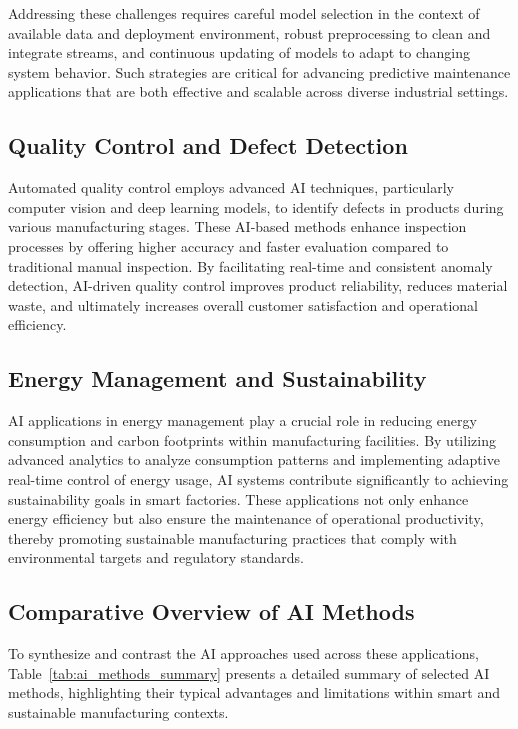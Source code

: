 \documentclass[sigconf]{acmart}
\begin{document}
Addressing these challenges requires careful model selection in the context of available data and deployment environment, robust preprocessing to clean and integrate streams, and continuous updating of models to adapt to changing system behavior. Such strategies are critical for advancing predictive maintenance applications that are both effective and scalable across diverse industrial settings.

\subsection{Quality Control and Defect Detection}
Automated quality control employs advanced AI techniques, particularly computer vision and deep learning models, to identify defects in products during various manufacturing stages. These AI-based methods enhance inspection processes by offering higher accuracy and faster evaluation compared to traditional manual inspection. By facilitating real-time and consistent anomaly detection, AI-driven quality control improves product reliability, reduces material waste, and ultimately increases overall customer satisfaction and operational efficiency.

\subsection{Energy Management and Sustainability}
AI applications in energy management play a crucial role in reducing energy consumption and carbon footprints within manufacturing facilities. By utilizing advanced analytics to analyze consumption patterns and implementing adaptive real-time control of energy usage, AI systems contribute significantly to achieving sustainability goals in smart factories. These applications not only enhance energy efficiency but also ensure the maintenance of operational productivity, thereby promoting sustainable manufacturing practices that comply with environmental targets and regulatory standards.

\subsection{Comparative Overview of AI Methods}
To synthesize and contrast the AI approaches used across these applications, Table~\ref{tab:ai_methods_summary} presents a detailed summary of selected AI methods, highlighting their typical advantages and limitations within smart and sustainable manufacturing contexts.
\end{document}
